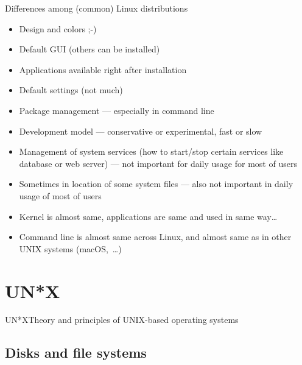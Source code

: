 \documentclass[compress, ucs, xelatex, 11pt, xcolor=svgnames, aspectratio=169,
	hyperref={
		bookmarks=true,
		unicode=true,
		colorlinks=true,
		pdftitle={Linux, command line and MetaCentrum},
		plainpages=false,
		pdfauthor={Vojtech Zeisek},
		pdfsubject={Course about use of Linux command line, writing shell scripts and using MetaCentrum of CESNET},
		pdfcreator={XeLaTeX},
		pdfkeywords={Linux, GNU, BASH, shell, command line, MetaCentrum},
		linkcolor=DarkRed, %
		anchorcolor=DarkBlue, %
		citecolor=Indigo, %
		filecolor=NavyBlue, %
		menucolor=DarkMagenta, %
		urlcolor=DarkBlue, %
		pdftex},
	url={hyphens, lowtilde} %
	]{beamer}
\begin{document}
\begin{frame}{Differences among (common) Linux distributions}
	\begin{itemize}
		\item Design and colors ;-)
		\item Default GUI (others can be installed)
		\item Applications available right after installation
		\item Default settings (not much)
		\item Package management --- especially in command line
		\item Development model --- conservative or experimental, fast or slow
		\item Management of system services (how to start/stop certain services like database or web server) --- not important for daily usage for most of users
		\item Sometimes in location of some system files --- also not important in daily usage of most of users
		\item Kernel is almost same, applications are same and used in same way\ldots
		\item Command line is almost same across Linux, and almost same as in other UNIX systems (macOS,~\ldots)
	\end{itemize}
\end{frame}

\section{UN*X}

\begin{frame}{UN*X}{Theory and principles of UNIX-based operating systems}
	\tableofcontents[currentsection, sectionstyle=show/hide, hideothersubsections]
\end{frame}

\subsection{Disks and file systems}
\end{document}

